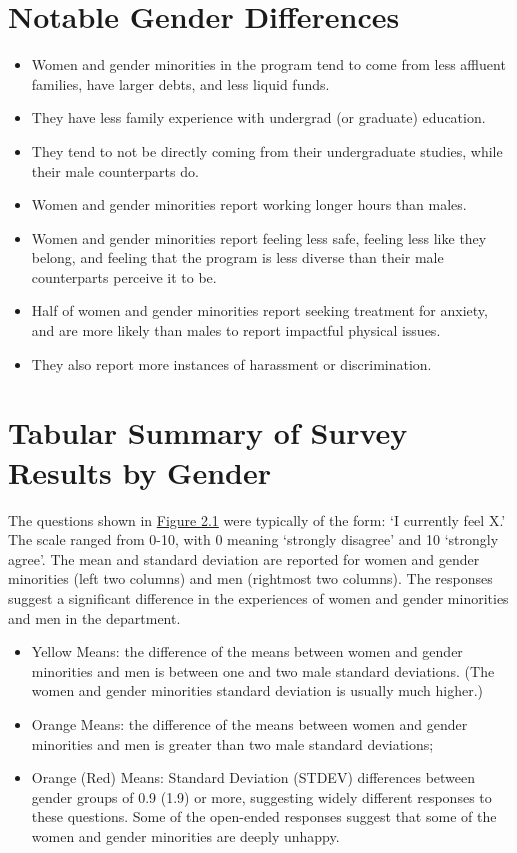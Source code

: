 \documentclass[oneside]{book}   %
\begin{document}
\section{Notable Gender Differences}

\begin{itemize}
	\item Women and gender minorities in the program tend to come from less affluent families, have larger debts, and less liquid funds. 
	\item They have less family experience with undergrad (or graduate) education.
	\item They tend to not be directly coming from their undergraduate studies, while their male counterparts do. 
	\item Women and gender minorities report working longer hours than males.
	\item Women and gender minorities report feeling less safe, feeling less like they belong, and feeling that the program is less diverse than their male counterparts perceive it to be.
	\item Half of women and gender minorities report seeking treatment for anxiety, and are more likely than males to report impactful physical issues.
	\item They also report more instances of harassment or discrimination.
\end{itemize}

\section{Tabular Summary of Survey Results by Gender}
\label{sec:tabular_grad}
The questions shown in \hyperlink{Fig 2.1}{Figure 2.1} were typically of the form: `I currently feel X.’ The scale ranged from 0-10, with 0 meaning `strongly disagree’ and 10 `strongly agree’. The mean and standard deviation are reported for women and gender minorities (left two columns) and men (rightmost two columns). The responses suggest a significant difference in the experiences of women and gender minorities and men in the department.

\begin{itemize}
	\item Yellow Means: the difference of the means between women and gender minorities and men is between one and two male standard deviations.  (The women and gender minorities standard deviation is usually much higher.)
	\item Orange Means: the difference of the means between women and gender minorities and men is greater than two male standard deviations; 
	\item Orange (Red) Means: Standard Deviation (STDEV) differences between gender groups of  0.9 (1.9) or more, suggesting widely different responses to these questions. Some of the open-ended responses suggest that some of the women and gender minorities are deeply unhappy.
\end{itemize}
\end{document}
